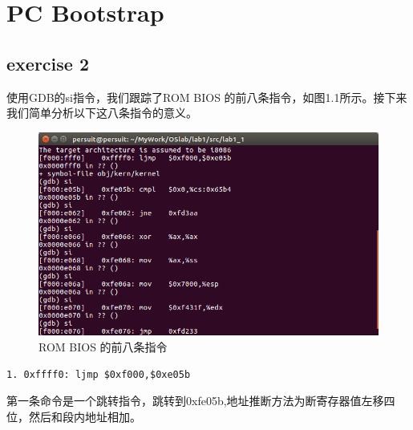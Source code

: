 \documentclass[]{ctexrep}
\begin{document}
%
%		
\chapter{PC Bootstrap}
\songti{}
\section{exercise 2}
使用GDB的si指令，我们跟踪了ROM BIOS 的前八条指令，如图1.1所示。接下来我们简单分析以下这八条指令的意义。
\begin{figure}[htbp!]
	\centering\includegraphics[scale=0.5]{figure/exercise2}
	\caption{ROM BIOS 的前八条指令}
\end{figure}
\begin{lstlisting}[language={[x86masm]Assembler}]
1. 0xffff0: ljmp $0xf000,$0xe05b
\end{lstlisting}
第一条命令是一个跳转指令，跳转到0xfe05b,地址推断方法为断寄存器值左移四位，然后和段内地址相加。
\end{document}
